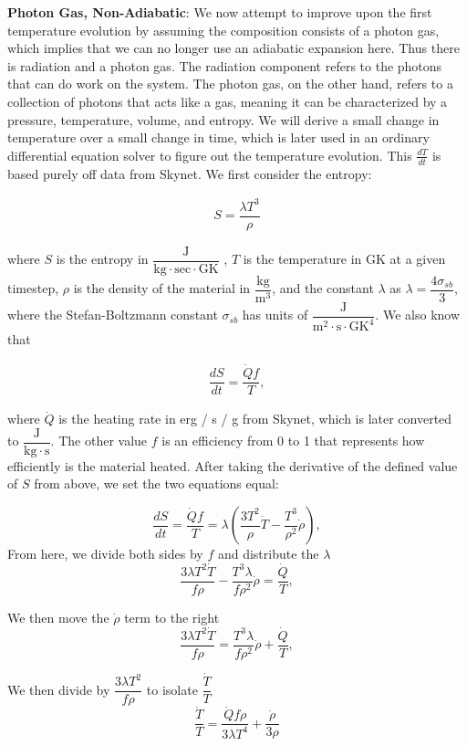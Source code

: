 \documentclass[11pt,a4paper]{article}
\begin{document}
\textbf{Photon Gas, Non-Adiabatic}: We now attempt to improve upon the first temperature evolution by assuming the composition consists of a photon gas, which implies that we can no longer use an adiabatic expansion here. Thus there is radiation and a photon gas. The radiation component refers to the photons that can do work on the system. The photon gas, on the other hand, refers to a collection of photons that acts like a gas, meaning it can be characterized by a pressure, temperature, volume, and entropy. We will derive a small change in temperature over a small change in time, which is later used in an ordinary differential equation solver to figure out the temperature evolution. This $\frac{dT}{dt}$ is based purely off data from Skynet. We first consider the entropy:

\begin{align}
	S = \dfrac{\lambda T^3}{\rho}
\end{align}

where $S$ is the entropy in $\mathrm{\dfrac{J}{kg \cdot sec \cdot GK}}$ , $T$ is the temperature in GK at a given timestep, $\rho$ is the density of the material in $\mathrm{\dfrac{kg}{m^3}}$, and the constant $\lambda$ as $\lambda =  \dfrac{4 \sigma_{sb}}{3}$, where the Stefan-Boltzmann constant $\sigma_{sb}$ has units of $\mathrm{\dfrac{J}{m^2 \cdot s \cdot {GK}^4}}$. We also know that 

\begin{align}
	\dfrac{dS}{dt} = \dfrac{\dot{Q} f}{T},
\end{align}

where $\dot{Q}$ is the heating rate in erg / s / g from Skynet, which is later converted to $\mathrm{\dfrac{J}{kg \cdot s}}$. The other value $f$ is an efficiency from 0 to 1 that represents how efficiently is the material heated. After taking the derivative of the defined value of $S$ from above, we set the two equations equal: 

$$ \dfrac{dS}{dt} = \dfrac{\dot{Q} f}{T} = \lambda \left(\dfrac{3T^2}{\rho}\dot{T} - \dfrac{T^3}{\rho^2}\dot{\rho} \right),$$ From here, we divide both sides by $f$ and distribute the $\lambda$
$$ \dfrac{3 \lambda T^2 \dot{T}}{f \rho} - \dfrac{T^3 \lambda}{f \rho^2}\dot{\rho} = \dfrac{\dot{Q}}{T}, $$

We then move the $\dot{\rho}$ term to the right 
$$ \dfrac{3 \lambda T^2 \dot{T}}{f \rho} = \dfrac{T^3 \lambda}{f \rho^2}\dot{\rho} + \dfrac{\dot{Q}}{T}, $$

We then divide by $\dfrac{3 \lambda T^2}{f \rho} $ to isolate $\dfrac{\dot{T}}{T}$
$$ \dfrac{\dot{T}}{T} = \dfrac{\dot{Q} f \rho}{3 \lambda T^4} + \dfrac{\dot{\rho}}{3 \rho} $$ 
\end{document}
